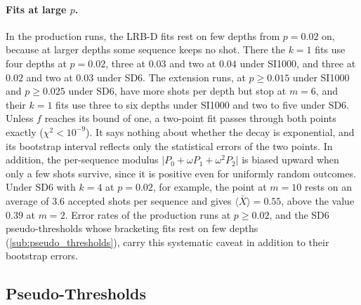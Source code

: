 \paragraph{Fits at large $p$.}
In the production runs, the LRB-D fits rest on few depths from $p = 0.02$ on, because at larger depths some sequence keeps no shot. There the $k = 1$ fits use four depths at $p = 0.02$, three at $0.03$ and two at $0.04$ under SI1000, and three at $0.02$ and two at $0.03$ under SD6. The extension runs, at $p \ge 0.015$ under SI1000 and $p \ge 0.025$ under SD6, have more shots per depth but stop at $m = 6$, and their $k = 1$ fits use three to six depths under SI1000 and two to five under SD6. Unless $f$ reaches its bound of one, a two-point fit passes through both points exactly ($\chi^2 < 10^{-9}$). It says nothing about whether the decay is exponential, and its bootstrap interval reflects only the statistical errors of the two points. In addition, the per-sequence modulus $\lvert P_0 + \omega P_1 + \omega^2 P_2 \rvert$ is biased upward when only a few shots survive, since it is positive even for uniformly random outcomes. Under SD6 with $k = 4$ at $p = 0.02$, for example, the point at $m = 10$ rests on an average of 3.6 accepted shots per sequence and gives $\langle \bar{X} \rangle = 0.55$, above the value $0.39$ at $m = 2$. Error rates of the production runs at $p \ge 0.02$, and the SD6 pseudo-thresholds whose bracketing fits rest on few depths (\autoref{sub:pseudo_thresholds}), carry this systematic caveat in addition to their bootstrap errors.

\subsection{Pseudo-Thresholds}
\label{sub:pseudo_thresholds}


